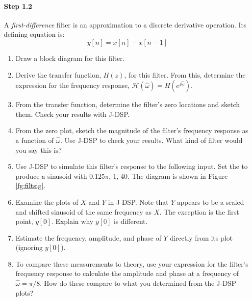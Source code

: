 \paragraph{Step 1.2} A \emph{first-difference} filter is an
approximation to a discrete derivative operation. Its defining
equation is:
\begin{equation}
  y[n] = x[n] - x[n-1]
\end{equation}

\begin{enumerate}\renewcommand{\theenumi}{\alph{enumi}}

\item Draw a block diagram for this filter.


\item Derive the transfer function, $H(z)$, for this filter. From
	  this, determine the expression for the frequency response,
	  $\mathcal{H}(\hat{\omega})=H(e^{j\hat{\omega}})$.


\item From the transfer function, determine the filter's zero
	locations and sketch them. Check your results with J-DSP.


\item From the zero plot, sketch the magnitude of the filter's
	  frequency response as a function of $\hat{\omega}$. Use J-DSP to
	  check your results. What kind of filter would you say this is?
	  

\item Use J-DSP to simulate this filter's response to the following
	  input. Set the  to produce a sinusoid with
	   $0.125\pi$,  1, 
	  40. The diagram is shown in Figure \ref{fg:filtsig}.

\item Examine the plots of $X$ and $Y$ in J-DSP. Note that $Y$ appears
	  to be a scaled and shifted sinusoid of the same frequency as
	  $X$. The exception is the first point, $y[0]$. Explain why $y[0]$ is
	  different.


\item Estimate the frequency, amplitude, and phase of $Y$ directly
	  from its plot (ignoring $y[0]$).


\item To compare these measurements to theory, use your expression for
	  the filter's frequency response to calculate the amplitude and phase
	  at a frequency of $\hat{\omega} = \pi/8$. How do these compare to
	  what you determined from the J-DSP plots?


\end{enumerate}


